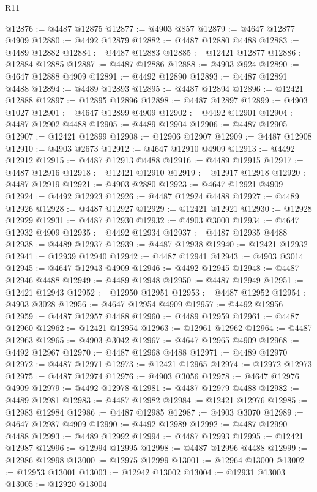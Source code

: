 \begin{lexlean}{R11}
\begin{coremodule}
@12876 := @4487 @12875
@12877 := @4903 @857
@12879 := @4647 @12877 @4909
@12880 := @4492 @12879
@12882 := @4487 @12880 @4488
@12883 := @4489 @12882
@12884 := @4487 @12883
@12885 := @12421 @12877
@12886 := @12884 @12885
@12887 := @4487 @12886
@12888 := @4903 @924
@12890 := @4647 @12888 @4909
@12891 := @4492 @12890
@12893 := @4487 @12891 @4488
@12894 := @4489 @12893
@12895 := @4487 @12894
@12896 := @12421 @12888
@12897 := @12895 @12896
@12898 := @4487 @12897
@12899 := @4903 @1027
@12901 := @4647 @12899 @4909
@12902 := @4492 @12901
@12904 := @4487 @12902 @4488
@12905 := @4489 @12904
@12906 := @4487 @12905
@12907 := @12421 @12899
@12908 := @12906 @12907
@12909 := @4487 @12908
@12910 := @4903 @2673
@12912 := @4647 @12910 @4909
@12913 := @4492 @12912
@12915 := @4487 @12913 @4488
@12916 := @4489 @12915
@12917 := @4487 @12916
@12918 := @12421 @12910
@12919 := @12917 @12918
@12920 := @4487 @12919
@12921 := @4903 @2880
@12923 := @4647 @12921 @4909
@12924 := @4492 @12923
@12926 := @4487 @12924 @4488
@12927 := @4489 @12926
@12928 := @4487 @12927
@12929 := @12421 @12921
@12930 := @12928 @12929
@12931 := @4487 @12930
@12932 := @4903 @3000
@12934 := @4647 @12932 @4909
@12935 := @4492 @12934
@12937 := @4487 @12935 @4488
@12938 := @4489 @12937
@12939 := @4487 @12938
@12940 := @12421 @12932
@12941 := @12939 @12940
@12942 := @4487 @12941
@12943 := @4903 @3014
@12945 := @4647 @12943 @4909
@12946 := @4492 @12945
@12948 := @4487 @12946 @4488
@12949 := @4489 @12948
@12950 := @4487 @12949
@12951 := @12421 @12943
@12952 := @12950 @12951
@12953 := @4487 @12952
@12954 := @4903 @3028
@12956 := @4647 @12954 @4909
@12957 := @4492 @12956
@12959 := @4487 @12957 @4488
@12960 := @4489 @12959
@12961 := @4487 @12960
@12962 := @12421 @12954
@12963 := @12961 @12962
@12964 := @4487 @12963
@12965 := @4903 @3042
@12967 := @4647 @12965 @4909
@12968 := @4492 @12967
@12970 := @4487 @12968 @4488
@12971 := @4489 @12970
@12972 := @4487 @12971
@12973 := @12421 @12965
@12974 := @12972 @12973
@12975 := @4487 @12974
@12976 := @4903 @3056
@12978 := @4647 @12976 @4909
@12979 := @4492 @12978
@12981 := @4487 @12979 @4488
@12982 := @4489 @12981
@12983 := @4487 @12982
@12984 := @12421 @12976
@12985 := @12983 @12984
@12986 := @4487 @12985
@12987 := @4903 @3070
@12989 := @4647 @12987 @4909
@12990 := @4492 @12989
@12992 := @4487 @12990 @4488
@12993 := @4489 @12992
@12994 := @4487 @12993
@12995 := @12421 @12987
@12996 := @12994 @12995
@12998 := @4487 @12996 @4488
@12999 := @12986 @12998
@13000 := @12975 @12999
@13001 := @12964 @13000
@13002 := @12953 @13001
@13003 := @12942 @13002
@13004 := @12931 @13003
@13005 := @12920 @13004

\end{coremodule}
\end{lexlean}
